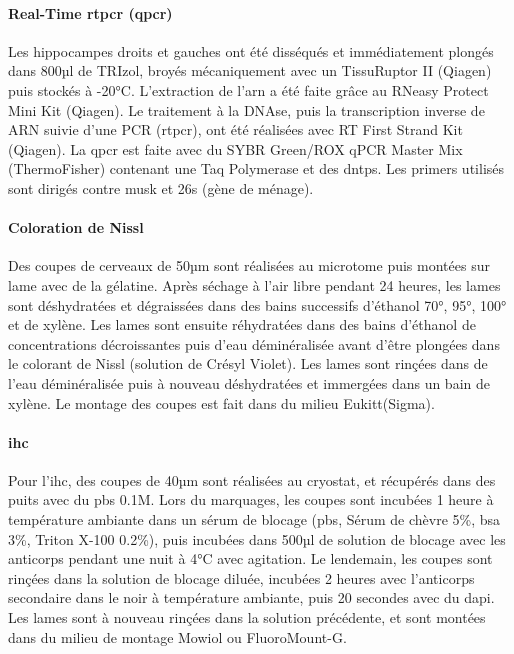 \paragraph{Real-Time \acrshort{rtpcr} (\acrshort{qpcr})}
\label{par:qPCR}
	Les hippocampes droits et gauches ont été disséqués et immédiatement plongés dans 800µl de TRIzol\textregistered, broyés mécaniquement avec un TissuRuptor II (Qiagen\textregistered) puis stockés à -20°C. L'extraction de l'\acrshort{arn} a été faite grâce au RNeasy Protect Mini Kit (Qiagen\textregistered). Le traitement à la DNAse, puis la transcription inverse de ARN suivie d'une PCR (\acrshort{rtpcr}), ont été réalisées avec RT First Strand Kit (Qiagen\textregistered). La \gls{qpcr} est faite avec du SYBR Green/ROX qPCR Master Mix (ThermoFisher\textregistered) contenant une Taq Polymerase et des \glspl{dntp}. Les primers utilisés sont dirigés contre \gls{musk} et \acrshort{26s} (gène de ménage).
	
\paragraph{Coloration de Nissl}
\label{par:Nissl}
	Des coupes de cerveaux de 50µm sont réalisées au microtome puis montées sur lame avec de la gélatine. Après séchage à l'air libre pendant 24 heures, les lames sont déshydratées et dégraissées dans des bains successifs d'éthanol 70°, 95°, 100° et de xylène. Les lames sont ensuite réhydratées dans des bains d'éthanol de concentrations décroissantes puis d'eau déminéralisée avant d'être plongées dans le colorant de Nissl (solution de Crésyl Violet).  Les lames sont rinçées dans de l'eau déminéralisée puis à nouveau déshydratées et immergées dans un bain de xylène. Le montage des coupes est fait dans du milieu Eukitt\textregistered (Sigma).
	
\paragraph{\Acrlong{ihc}}	
\label{par:ihc}
	Pour l'\Gls{ihc}, des coupes de 40µm sont réalisées au cryostat, et récupérés dans des puits avec du \acrshort{pbs} 0.1M. Lors du marquages, les coupes sont incubées 1 heure à température ambiante dans un sérum de blocage (\acrshort{pbs}, Sérum de chèvre 5\%, \acrshort{bsa} 3\%, Triton X-100 0.2\%), puis  incubées dans 500µl de solution de blocage avec les anticorps pendant une nuit à 4°C avec agitation. Le lendemain, les coupes sont rinçées dans la solution de blocage diluée, incubées 2 heures avec l'anticorps secondaire dans le noir à température ambiante, puis 20 secondes avec du \gls{dapi}. Les lames sont à nouveau rinçées dans la solution précédente, et sont montées dans du milieu de montage Mowiol ou FluoroMount-G\textregistered.
	
